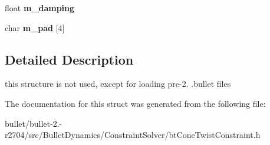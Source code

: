 \begin{DoxyCompactItemize}
\item 
\hypertarget{structbt_cone_twist_constraint_data_a8238dcb16ff48b51f7efaff2bf066b74}{float {\bfseries m\+\_\+damping}}\label{structbt_cone_twist_constraint_data_a8238dcb16ff48b51f7efaff2bf066b74}

\item 
\hypertarget{structbt_cone_twist_constraint_data_acd4e20e5fc0aaa46143e5fba3d1e084b}{char {\bfseries m\+\_\+pad} \mbox{[}4\mbox{]}}\label{structbt_cone_twist_constraint_data_acd4e20e5fc0aaa46143e5fba3d1e084b}

\end{DoxyCompactItemize}


\subsection{Detailed Description}
this structure is not used, except for loading pre-\/2. .bullet files 

The documentation for this struct was generated from the following file\+:\begin{DoxyCompactItemize}
\item 
bullet/bullet-\/2.-\/r2704/src/\+Bullet\+Dynamics/\+Constraint\+Solver/bt\+Cone\+Twist\+Constraint.\+h\end{DoxyCompactItemize}
